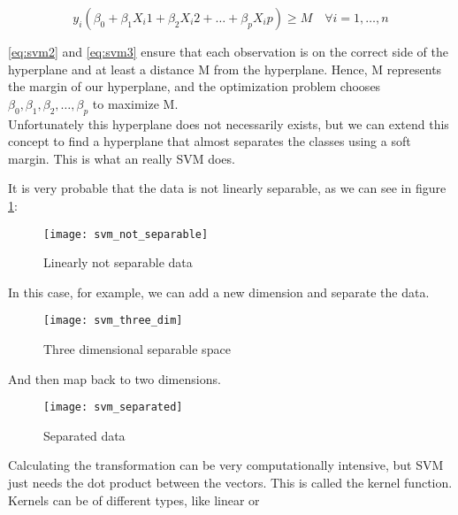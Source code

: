 \begin{equation} \label{eq:svm3}
y_i(\beta_0 + \beta_1 X_i1 + \beta_2 X_i2 + \dots + \beta_p X_ip) \ge M \quad \forall i = 1, \dots, n
\end{equation}

\ref{eq:svm2} and \ref{eq:svm3} ensure that each observation is on the correct side of the hyperplane and at least a distance M from the hyperplane. Hence, M represents the margin of our hyperplane, and the optimization problem chooses $\beta_0, \beta_1, \beta_2, \dots, \beta_p$ to maximize M. \\

Unfortunately this hyperplane does not necessarily exists, but we can extend this concept to find a hyperplane that almost separates the classes using a soft margin. This is what an really SVM does.

It is very probable that the data is not linearly separable, as we can see in figure \ref{fig:svmnotsep}:
\begin{figure}[H]
	\centering
	\texttt{[image: svm\_not\_separable]}
	\caption{Linearly not separable data \cite{svm_monkeylearn}}
	\label{fig:svmnotsep}
\end{figure}

In this case, for example, we can add a new dimension and separate the data. 
\begin{figure}[H]
	\centering
	\texttt{[image: svm\_three\_dim]}
	\caption{Three dimensional separable space \cite{svm_monkeylearn}}
\end{figure} 

And then map back to two dimensions.
\begin{figure}[H]
	\centering
	\texttt{[image: svm\_separated]}
	\caption{Separated data \cite{svm_monkeylearn}}
\end{figure}

Calculating the transformation can be very computationally intensive, but SVM just needs the dot product between the vectors. This is called the kernel function. Kernels can be of different types, like linear or 
